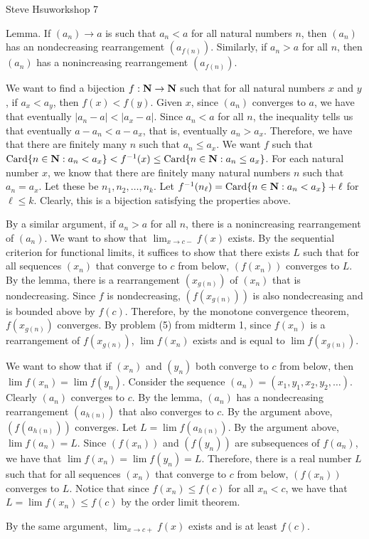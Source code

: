 \def\natural{{\bf N}}
\def\Card{\hbox{Card}}
\def\abs#1{\vert#1\vert}
\centerline{Steve Hsu\hfill workshop 7}
\proclaim Lemma. If $(a_n) \to a$ is such that
$a_n < a$ for all natural numbers $n$,
then $(a_n)$ has an nondecreasing rearrangement $(a_{f(n)})$.
Similarly, if $a_n > a$ for all $n$,
then $(a_n)$ has a nonincreasing rearrangement $(a_{f(n)})$.

We want to find a bijection $f : \natural \to \natural$
such that for all natural numbers $x$ and $y$,
if $a_x < a_y$, then $f(x) < f(y)$.
Given $x$, since $(a_n)$ converges to $a$,
we have that eventually $\abs{a_n - a} < \abs{a_x - a}$.
Since $a_n < a$ for all $n$, the inequality tells us that
eventually $a - a_n < a - a_x$, that is, eventually $a_n > a_x$.
Therefore, we have that there are finitely many $n$
such that $a_n \le a_x$.
We want $f$ such that $\Card \{n \in \natural : a_n < a_x\} <
f^{-1}(x) \le \Card \{n \in \natural : a_n \le a_x\}$.
For each natural number $x$, we know that
there are finitely many natural numbers $n$ such that $a_n = a_x$.
Let these be $n_1, n_2, \ldots, n_k$.
Let $f^{-1}(n_\ell) = \Card \{n \in \natural : a_n < a_x\} + \ell$
for $\ell \le k$.
Clearly, this is a bijection satisfying the properties above.

By a similar argument, if $a_n > a$ for all $n$,
there is a nonincreasing rearrangement of $(a_n)$.
\bigskip
We want to show that $\lim _{x \to c -} f(x)$ exists.
By the sequential criterion for functional limits,
it suffices to show that there exists $L$ such that
for all sequences $(x_n)$ that converge to $c$ from below,
$(f(x_n))$ converges to $L$.
By the lemma, there is a rearrangement $(x_{g(n)})$ of $(x_n)$
that is nondecreasing.
Since $f$ is nondecreasing, $(f(x_{g(n)}))$ is also nondecreasing
and is bounded above by $f(c)$.
Therefore, by the monotone convergence theorem,
$f(x_{g(n)})$ converges.
By problem (5) from midterm 1,
since $f(x_n)$ is a rearrangement of $f(x_{g(n)})$,
$\lim f(x_n)$ exists and is equal to $\lim f(x_{g(n)})$.

We want to show that if $(x_n)$ and $(y_n)$ both converge to $c$ from below,
then $\lim f(x_n) = \lim f(y_n)$.
Consider the sequence $(a_n) = (x_1, y_1, x_2, y_2, \ldots)$.
Clearly $(a_n)$ converges to $c$.
By the lemma, $(a_n)$ has a nondecreasing rearrangement $(a_{h(n)})$
that also converges to $c$.
By the argument above, $(f(a_{h(n)}))$ converges.
Let $L = \lim f(a_{h(n)})$.
By the argument above, $\lim f(a_n) = L$.
Since $(f(x_n))$ and $(f(y_n))$ are subsequences of $f(a_n)$,
we have that $\lim f(x_n) = \lim f(y_n) = L$.
Therefore, there is a real number $L$ such that
for all sequences $(x_n)$ that converge to $c$ from below,
$(f(x_n))$ converges to $L$.
Notice that since $f(x_n) \le f(c)$ for all $x_n < c$,
we have that $L = \lim f(x_n) \le f(c)$ by the order limit theorem.

By the same argument, $\lim _{x \to c +} f(x)$ exists
and is at least $f(c)$.
\bye
